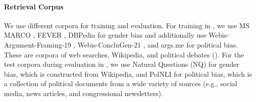\paragraph{Retrieval Corpus}
We use different corpora for training and evaluation. For training in , we use MS MARCO \citep{bajaj2016ms}, FEVER \citep{thorne2018fever}, DBPedia \citep{hasibi2017dbpedia} for gender bias and additionally use Webis-Argument-Framing-19 \citep{ajjour:2019b}, Webis-ConcluGen-21 \citep{syed:2021a}, and args.me \citep{ajjour:2019a} for political bias. These are corpora of web searches, Wikipedia, and political debates (). For the test corpora during evaluation in , we use Natural Questions (NQ) \citep{kwiatkowski2019natural} for gender bias, which is constructed from Wikipedia, and PolNLI \citep{burnham2024politicaldebateefficientzeroshot} for political bias, which is a collection of political documents from a wide variety of sources (e.g., social media, news articles, and congressional newsletters).